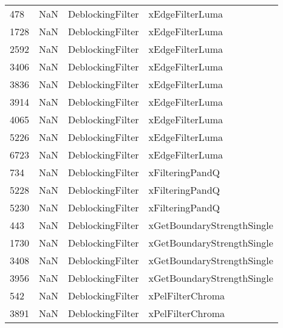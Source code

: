 \begin{tabular}{llll}
478  &                   NaN &           DeblockingFilter &                           xEdgeFilterLuma \\
1728 &                   NaN &           DeblockingFilter &                           xEdgeFilterLuma \\
2592 &                   NaN &           DeblockingFilter &                           xEdgeFilterLuma \\
3406 &                   NaN &           DeblockingFilter &                           xEdgeFilterLuma \\
3836 &                   NaN &           DeblockingFilter &                           xEdgeFilterLuma \\
3914 &                   NaN &           DeblockingFilter &                           xEdgeFilterLuma \\
4065 &                   NaN &           DeblockingFilter &                           xEdgeFilterLuma \\
5226 &                   NaN &           DeblockingFilter &                           xEdgeFilterLuma \\
6723 &                   NaN &           DeblockingFilter &                           xEdgeFilterLuma \\
734  &                   NaN &           DeblockingFilter &                           xFilteringPandQ \\
5228 &                   NaN &           DeblockingFilter &                           xFilteringPandQ \\
5230 &                   NaN &           DeblockingFilter &                           xFilteringPandQ \\
443  &                   NaN &           DeblockingFilter &                xGetBoundaryStrengthSingle \\
1730 &                   NaN &           DeblockingFilter &                xGetBoundaryStrengthSingle \\
3408 &                   NaN &           DeblockingFilter &                xGetBoundaryStrengthSingle \\
3956 &                   NaN &           DeblockingFilter &                xGetBoundaryStrengthSingle \\
542  &                   NaN &           DeblockingFilter &                          xPelFilterChroma \\
3891 &                   NaN &           DeblockingFilter &                          xPelFilterChroma \\

\end{tabular}
